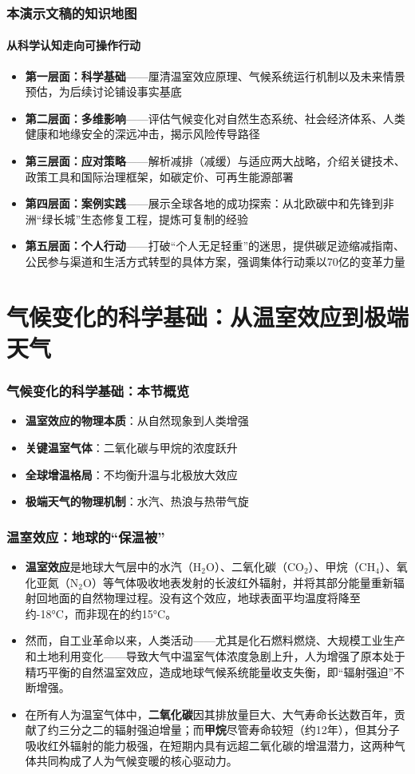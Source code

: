 \documentclass[11pt]{beamer}
\begin{document}
\begin{frame}
\frametitle{本演示文稿的知识地图}
\framesubtitle{从科学认知走向可操作行动}
\begin{itemize}
    \item \textbf{第一层面：科学基础}——厘清温室效应原理、气候系统运行机制以及未来情景预估，为后续讨论铺设事实基底
    \item \textbf{第二层面：多维影响}——评估气候变化对自然生态系统、社会经济体系、人类健康和地缘安全的深远冲击，揭示风险传导路径
    \item \textbf{第三层面：应对策略}——解析减排（减缓）与适应两大战略，介绍关键技术、政策工具和国际治理框架，如碳定价、可再生能源部署
    \item \textbf{第四层面：案例实践}——展示全球各地的成功探索：从北欧碳中和先锋到非洲“绿长城”生态修复工程，提炼可复制的经验
    \item \textbf{第五层面：个人行动}——打破“个人无足轻重”的迷思，提供碳足迹缩减指南、公民参与渠道和生活方式转型的具体方案，强调\alert{集体行动乘以70亿}的变革力量
\end{itemize}
\end{frame}

\section{气候变化的科学基础：从温室效应到极端天气}

\begin{frame}
\frametitle{气候变化的科学基础：本节概览}
\begin{itemize}
    \item \textbf{温室效应的物理本质}：从自然现象到人类增强
    \item \textbf{关键温室气体}：二氧化碳与甲烷的浓度跃升
    \item \textbf{全球增温格局}：不均衡升温与北极放大效应
    \item \textbf{极端天气的物理机制}：水汽、热浪与热带气旋
\end{itemize}
\end{frame}

\begin{frame}
\frametitle{温室效应：地球的“保温被”}
\begin{itemize}
    \item \textbf{温室效应}是地球大气层中的水汽（H$_2$O）、二氧化碳（CO$_2$）、甲烷（CH$_4$）、氧化亚氮（N$_2$O）等气体吸收地表发射的长波红外辐射，并将其部分能量重新辐射回地面的自然物理过程。没有这个效应，地球表面平均温度将降至约-18°C，而非现在的约15°C。
    
    \item 然而，自工业革命以来，人类活动——尤其是化石燃料燃烧、大规模工业生产和土地利用变化——导致大气中温室气体浓度急剧上升，\alert{人为增强了原本处于精巧平衡的自然温室效应}，造成地球气候系统能量收支失衡，即“辐射强迫”不断增强。
    
    \item 在所有人为温室气体中，\textbf{二氧化碳}因其排放量巨大、大气寿命长达数百年，贡献了约三分之二的辐射强迫增量；而\textbf{甲烷}尽管寿命较短（约12年），但其分子吸收红外辐射的能力极强，在短期内具有远超二氧化碳的增温潜力，这两种气体共同构成了人为气候变暖的核心驱动力。
\end{itemize}
\end{frame}
\end{document}
